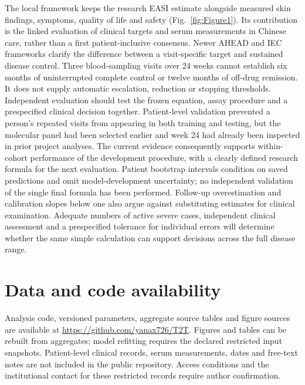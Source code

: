 \documentclass[10pt,a4paper]{article}
\begin{document}
The local framework keeps the research EASI estimate alongside measured skin findings, symptoms, quality of life and safety (Fig.~\ref{fig:Figure1}). Its contribution is the linked evaluation of clinical targets and serum measurements in Chinese care, rather than a first patient-inclusive consensus. Newer AHEAD and IEC frameworks clarify the difference between a visit-specific target and sustained disease control.\citep{silverberg2024ahead,merola2026iec} Three blood-sampling visits over 24 weeks cannot establish six months of uninterrupted complete control or twelve months of off-drug remission. It does not supply automatic escalation, reduction or stopping thresholds. Independent evaluation should test the frozen equation, assay procedure and a prespecified clinical decision together. Patient-level validation prevented a person's repeated visits from appearing in both training and testing, but the molecular panel had been selected earlier and week 24 had already been inspected in prior project analyses. The current evidence consequently supports within-cohort performance of the development procedure, with a clearly defined research formula for the next evaluation. Patient bootstrap intervals condition on saved predictions and omit model-development uncertainty; no independent validation of the single final formula has been performed. Follow-up overestimation and calibration slopes below one also argue against substituting estimates for clinical examination. Adequate numbers of active severe cases, independent clinical assessment and a prespecified tolerance for individual errors will determine whether the same simple calculation can support decisions across the full disease range.

\section*{Data and code availability}
Analysis code, versioned parameters, aggregate source tables and figure sources are available at \url{https://github.com/yanax726/T2T}. Figures and tables can be rebuilt from aggregates; model refitting requires the declared restricted input snapshots. Patient-level clinical records, serum measurements, dates and free-text notes are not included in the public repository. Access conditions and the institutional contact for these restricted records require author confirmation.

{\small\setlength{\bibsep}{2pt}}
\end{document}
